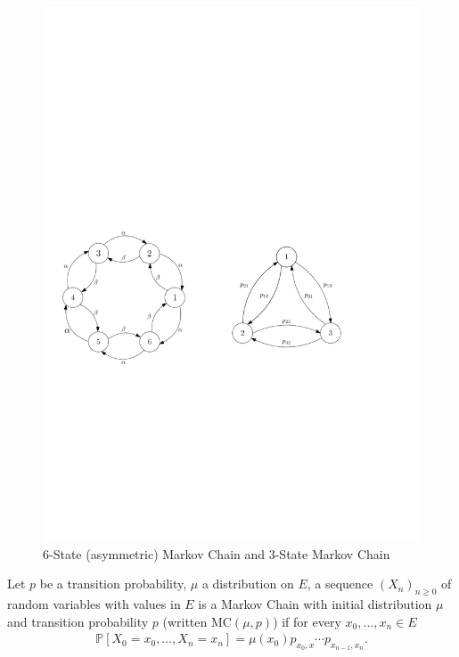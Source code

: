 \begin{figure}[!h]
	\centering
	\includegraphics[width=\textwidth]{figures/n_step_MC.pdf}
\caption{6-State (asymmetric) Markov Chain and 3-State Markov Chain}
\end{figure}

\begin{defn}
	Let $p$ be a transition probability, $\mu$ a distribution on $E$, a sequence $(X_n)_{n\geq 0}$ of random variables with values in $E $ is a Markov Chain with initial distribution $\mu$ and transition probability $p$ (written $ \textrm{MC}(\mu, p)$) if for every $x_0, \ldots, x_n \in E$
\begin{align}
	\boxed{ \mathbb{P} \left[ X_0=x_0, \ldots ,X_n=x_n \right] = \mu(x_0)p_{x_0,x} \cdots p_{x_{n-1},x_{n}} .}
\end{align}
\end{defn}


